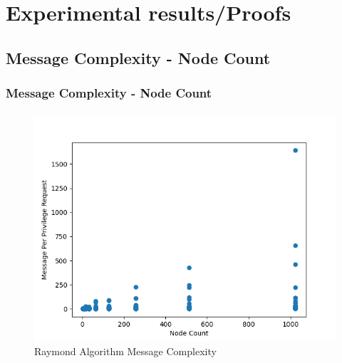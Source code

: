 \documentclass[11pt]{beamer}              %
\begin{document}
\section{Experimental results/Proofs}

\subsection{Message Complexity - Node Count}
\begin{frame}
\frametitle{Message Complexity - Node Count}
\framesubtitle{}
\begin{figure}
    \centering
    \includegraphics[scale=0.5]{figures/RaymondAlgorithmMessageComplexity.png}
    \caption{Raymond Algorithm Message Complexity}
    \label{fig:raymond_algoritm_message_complexity}
\end{figure}
\end{frame}
\end{document}
